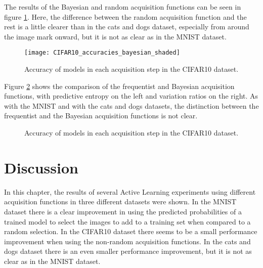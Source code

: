 The results of the Bayesian and random acquisition functions can be seen in figure \ref{fig:CIFAR10_accuracies_bayesian}. Here, the difference between the random acquisition function and the rest is a little clearer than in the cats and dogs dataset, especially from around the  image mark onward, but it is not as clear as in the MNIST dataset.

\begin{figure}[H]
    \centering
    \texttt{[image: CIFAR10\_accuracies\_bayesian\_shaded]}
    \caption{Accuracy of models in each acquisition step in the CIFAR10 dataset.}
    \label{fig:CIFAR10_accuracies_bayesian}
\end{figure}

Figure \ref{fig:CIFAR10_bayesian_vs_freq} shows the comparison of the frequentist and Bayesian acquisition functions, with predictive entropy on the left and variation ratios on the right. As with the MNIST and with the cats and dogs datasets, the distinction between the frequentist and the Bayesian acquisition functions is not clear.

\begin{figure}[H]
    \centering
    \hfill
    \caption{Accuracy of models in each acquisition step in the CIFAR10 dataset.}
    \label{fig:CIFAR10_bayesian_vs_freq}
\end{figure}



\section{Discussion}

In this chapter, the results of several Active Learning experiments using different acquisition functions in three different datasets were shown. In the MNIST dataset there is a clear improvement in using the predicted probabilities of a trained model to select the images to add to a training set when compared to a random selection. In the CIFAR10 dataset there seems to be a small performance improvement when using the non-random acquisition functions. In the cats and dogs dataset there is an even smaller performance improvement, but it is not as clear as in the MNIST dataset.

